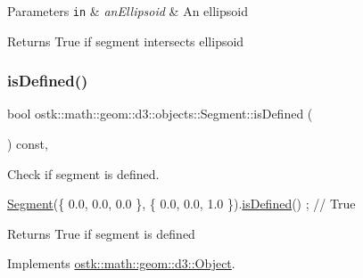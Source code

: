 \begin{DoxyParams}[1]{Parameters}
\mbox{\tt in}  & {\em an\+Ellipsoid} & An ellipsoid \\
\hline
\end{DoxyParams}
\begin{DoxyReturn}{Returns}
True if segment intersects ellipsoid 
\end{DoxyReturn}
\mbox{\label{classostk_1_1math_1_1geom_1_1d3_1_1objects_1_1_segment_ab89a57a59d50bfd6fe609e92d158e6ec}} 
\subsubsection{\texorpdfstring{is\+Defined()}{isDefined()}}
{\footnotesize\ttfamily bool ostk\+::math\+::geom\+::d3\+::objects\+::\+Segment\+::is\+Defined (\begin{DoxyParamCaption}{ }\end{DoxyParamCaption}) const\hspace{0.3cm}{\ttfamily [override]}, {\ttfamily [virtual]}}



Check if segment is defined. 


\begin{DoxyCode}
\hyperlink{classostk_1_1math_1_1geom_1_1d3_1_1objects_1_1_segment_aa2cb60ce06335a5f76120c658219494c}{Segment}(\{ 0.0, 0.0, 0.0 \}, \{ 0.0, 0.0, 1.0 \}).\hyperlink{classostk_1_1math_1_1geom_1_1d3_1_1objects_1_1_segment_ab89a57a59d50bfd6fe609e92d158e6ec}{isDefined}() ; \textcolor{comment}{// True}
\end{DoxyCode}


\begin{DoxyReturn}{Returns}
True if segment is defined 
\end{DoxyReturn}


Implements \hyperlink{classostk_1_1math_1_1geom_1_1d3_1_1_object_a271a1964cd208be85ce9a0a429395ad8}{ostk\+::math\+::geom\+::d3\+::\+Object}.

\mbox{\label{classostk_1_1math_1_1geom_1_1d3_1_1objects_1_1_segment_a472767f407b4fa42ae6de7d48ccb60d0}} 
